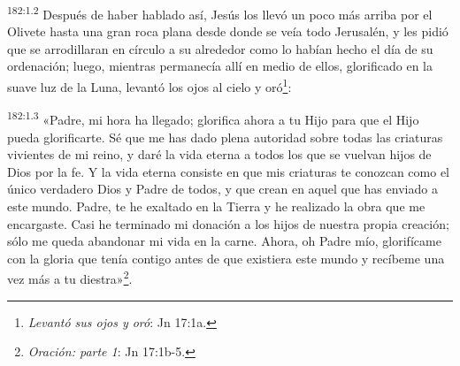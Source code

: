 \par 
\textsuperscript{182:1.2} Después de haber hablado así, Jesús los llevó un poco más arriba por el Olivete hasta una gran roca plana desde donde se veía todo Jerusalén, y les pidió que se arrodillaran en círculo a su alrededor como lo habían hecho el día de su ordenación; luego, mientras permanecía allí en medio de ellos, glorificado en la suave luz de la Luna, levantó los ojos al cielo y oró\footnote{\textit{Levantó sus ojos y oró}: Jn 17:1a.}:

\par 
\textsuperscript{182:1.3} «Padre, mi hora ha llegado; glorifica ahora a tu Hijo para que el Hijo pueda glorificarte. Sé que me has dado plena autoridad sobre todas las criaturas vivientes de mi reino, y daré la vida eterna a todos los que se vuelvan hijos de Dios por la fe. Y la vida eterna consiste en que mis criaturas te conozcan como el único verdadero Dios y Padre de todos, y que crean en aquel que has enviado a este mundo. Padre, te he exaltado en la Tierra y he realizado la obra que me encargaste. Casi he terminado mi donación a los hijos de nuestra propia creación; sólo me queda abandonar mi vida en la carne. Ahora, oh Padre mío, glorifícame con la gloria que tenía contigo antes de que existiera este mundo y recíbeme una vez más a tu diestra»\footnote{\textit{Oración: parte 1}: Jn 17:1b-5.}.

